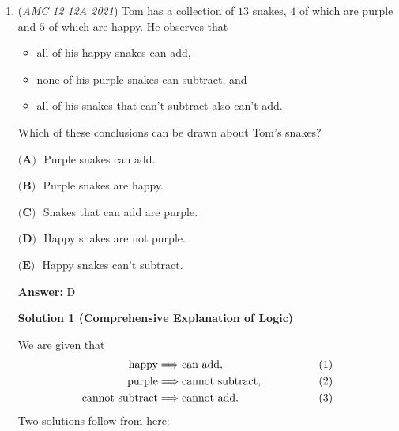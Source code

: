 \begin{enumerate}
 The units digit of the larger number is $0$ and the units digit of the smaller number is $2$, so the positive difference between the numbers is 8. There is only one answer choice that has this units digit, and that is $\boxed{\textbf{(D)} ~14{,}238}.$

 (Similar to MRENTHUSIASM's solution)

 


	\item (\textit{AMC 12 12A 2021}) Tom has a collection of $13$ snakes, $4$ of which are purple and $5$ of which are happy. He observes that


 
            \begin{itemize}
        \item all of his happy snakes can add,
            \end{itemize}
            
            \begin{itemize}
        \item none of his purple snakes can subtract, and
            \end{itemize}
            
            \begin{itemize}
        \item all of his snakes that can't subtract also can't add.
            \end{itemize}
            Which of these conclusions can be drawn about Tom's snakes?


 $\textbf{(A) }$ Purple snakes can add.


 $\textbf{(B) }$ Purple snakes are happy.


 $\textbf{(C) }$ Snakes that can add are purple.


 $\textbf{(D) }$ Happy snakes are not purple.


 $\textbf{(E) }$ Happy snakes can't subtract.


 
 \textbf{Answer: }D



\textbf{Solution 1 (Comprehensive Explanation of Logic)}

We are given that
 \begin{align*} \text{happy}&\Longrightarrow\text{can add}, &(1) \\ \text{purple}&\Longrightarrow\text{cannot subtract}, \hspace{15mm} &(2) \\ \text{cannot subtract}&\Longrightarrow\text{cannot add}. &(3) \end{align*}
Two solutions follow from here:


\end{enumerate}
